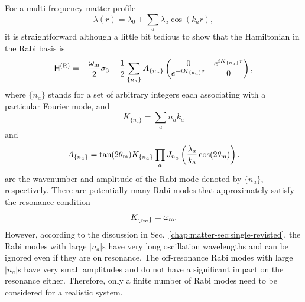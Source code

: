 For a multi-frequency matter profile
\begin{equation}
    \lambda(r) = \lambda_0 + \sum_a \lambda_a \cos (k_a r),
\end{equation}
it is straightforward although a little bit tedious to show that the Hamiltonian in the Rabi basis is
\begin{equation}
    \mathsf H^{(\mathrm R)} = - \frac{\omega_\mathrm m}{2} \sigma_3 - \frac{1}{2} \sum_{ \{n_a\} } A_{ \{n_a\} }
    \begin{pmatrix}
    0 &   e^{ i K_{\{n_a\}} r }\\
    e^{ -i K_{\{n_a\}} r}  & 0
    \end{pmatrix},
\end{equation}
where $\{n_a\}$ stands for a set of arbitrary integers each associating with a particular Fourier mode, and
\begin{equation}
    K_{\{n_a\}} = \sum_{a} n_a k_a
\end{equation}
and
\begin{equation}
    A_{\{n_a\}} = \tan(2\theta_\mathrm m) K_{\{n_a\}} \prod_{a} J_{n_a} \left( \frac{\lambda_{a}}{ k_{a} } \cos(2\theta_\mathrm m) \right).
\end{equation}
are the wavenumber and amplitude of the Rabi mode denoted by $\{n_a\}$, respectively. There are potentially many Rabi modes that approximately satisfy the resonance condition
\begin{equation}
    K_{\{n_a\}} = \omega_\mathrm m .
\end{equation}
However, according to the discussion in Sec.~\ref{chap:matter-sec:single-revisted}, the Rabi modes with large $\vert n_a\vert$s have very long oscillation wavelengths and can be ignored even if they are on resonance. The off-resonance Rabi modes with large $\vert n_a\vert$s have very small amplitudes and do not have a significant impact on the resonance either. Therefore, only a finite number of Rabi modes need to be considered for a realistic system.
